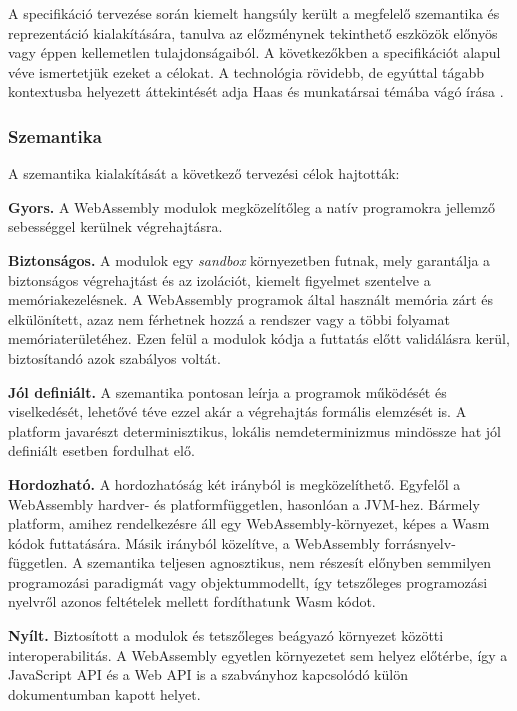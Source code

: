 A specifikáció tervezése során kiemelt hangsúly került a megfelelő szemantika és reprezentáció kialakítására, tanulva az előzménynek tekinthető eszközök előnyös vagy éppen kellemetlen tulajdonságaiból. A következőkben a specifikációt \cite{WebAssemblySpecification} alapul véve ismertetjük ezeket a célokat. A technológia rövidebb, de egyúttal tágabb kontextusba helyezett áttekintését adja Haas és munkatársai témába vágó írása \citeyear{Haas::BringingTheWebUpToSpeedWithWebAssembly}. 

\subsubsection{Szemantika}

A szemantika kialakítását a következő tervezési célok hajtották: 

\begin{outdentlist}
    \item[]\textbf{Gyors.}
    A WebAssembly modulok megközelítőleg a natív programokra jellemző sebességgel kerülnek végrehajtásra.
    \item[]\textbf{Biztonságos.}
    A modulok egy \textit{sandbox} környezetben futnak, mely garantálja a biztonságos végrehajtást és az izolációt, kiemelt figyelmet szentelve a memóriakezelésnek. A WebAssembly programok által használt memória zárt és elkülönített, azaz nem férhetnek hozzá a rendszer vagy a többi folyamat memóriaterületéhez. Ezen felül a modulok kódja a futtatás előtt validálásra kerül, biztosítandó azok szabályos voltát.
    \item[]\textbf{Jól definiált.}
    A szemantika pontosan leírja a programok működését és viselkedését, lehetővé téve ezzel akár a végrehajtás formális elemzését is. A platform javarészt determinisztikus, lokális nemdeterminizmus mindössze hat jól definiált esetben fordulhat elő.
    \item[]\textbf{Hordozható.}
    A hordozhatóság két irányból is megközelíthető. Egyfelől a WebAssembly hardver- és platformfüggetlen, hasonlóan a JVM-hez. Bármely platform, amihez rendelkezésre áll egy WebAssembly-környezet, képes a Wasm kódok futtatására. Másik irányból közelítve, a WebAssembly forrásnyelv-független. A szemantika teljesen agnosztikus, nem részesít előnyben semmilyen programozási paradigmát vagy objektummodellt, így tetszőleges programozási nyelvről azonos feltételek mellett fordíthatunk Wasm kódot.
    \item[]\textbf{Nyílt.}
    Biztosított a modulok és tetszőleges beágyazó környezet közötti interoperabilitás. A WebAssembly egyetlen környezetet sem helyez előtérbe, így a JavaScript API \cite{WebAssemblyJavaScriptInterface} és a Web API \cite{WebAssemblyWebAPI} is a szabványhoz kapcsolódó külön dokumentumban kapott helyet.
\end{outdentlist}

